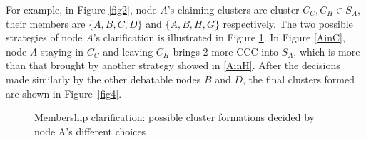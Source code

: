 \documentclass[journal,comsoc]{IEEEtran}
\theoremstyle{mytheoremstyle}
\theoremstyle{mytheoremstyle}
\theoremstyle{mytheoremstyle}
\begin{document}
For example, in Figure \ref{fig2}, node $A$'s claiming clusters are cluster $C_C, C_H\in S_A$, their members are $\{A,B,C,D\}$ and $\{A,B,H,G\}$ respectively. 
The two possible strategies of node $A$'s clarification is illustrated in Figure \ref{fig3}.
In Figure \ref{AinC}, node $A$ staying in $C_C$ and leaving $C_H$ brings 2 more CCC into $S_A$, which is more than that brought by another strategy showed in \ref{AinH}.
After the decisions made similarly by the other debatable nodes $B$ and $D$, the final clusters formed are shown in Figure~\ref{fig4}.



\begin{figure}[h]
\centering
{}
\caption[]{Membership clarification: possible cluster formations decided by node A's different choices} %
\label{fig3}
\end{figure}
\end{document}
